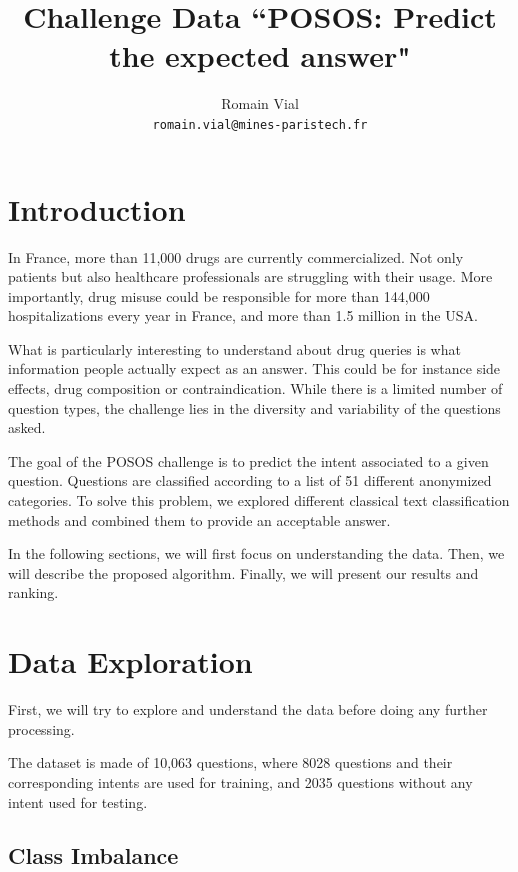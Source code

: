 \documentclass[11pt,twocolumn,letterpaper]{article}
\begin{document}
\title{Challenge Data ``POSOS: Predict the expected answer"}

\author{Romain Vial\\ \texttt{romain.vial@mines-paristech.fr}}

\maketitle

\section{Introduction}

In France, more than 11,000 drugs are currently commercialized. Not only patients but also healthcare professionals are struggling with their usage. More importantly, drug misuse could be responsible for more than 144,000 hospitalizations every year in France, and more than 1.5 million in the USA.

What is particularly interesting to understand about drug queries is what information people actually expect as an answer. This could be for instance side effects, drug composition or contraindication. While there is a limited number of question types, the challenge lies in the diversity and variability of the questions asked.

The goal of the POSOS challenge is to predict the intent associated to a given question. Questions are classified according to a list of 51 different anonymized categories. To solve this problem, we explored different classical text classification methods and combined them to provide an acceptable answer.

In the following sections, we will first focus on understanding the data. Then, we will describe the proposed algorithm. Finally, we will present our results and ranking.

\section{Data Exploration}

First, we will try to explore and understand the data before doing any further processing.

The dataset is made of 10,063 questions, where 8028 questions and their corresponding intents are used for training, and 2035 questions without any intent used for testing. 

\subsection{Class Imbalance}
\end{document}
